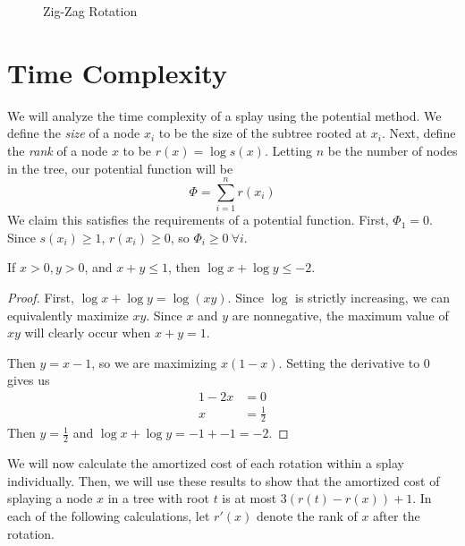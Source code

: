\documentclass[12pt]{article}
\newcommand{\lskip}{\vspace{\baselineskip}}
\begin{document}
\begin{enumerate}
\begin{figure}[!ht]
      \caption{Zig-Zag Rotation}
    \end{figure}
\end{enumerate}

\section*{Time Complexity}
We will analyze the time complexity of a splay using the potential method. We define the \emph{size} of a node $x_i$ to be the size of the subtree rooted at $x_i$. Next, define the \emph{rank} of a node $x$ to be $r(x) = \log s(x)$. Letting $n$ be the number of nodes in the tree, our potential function will be
\[ \Phi = \sum_{i=1}^n r(x_i) \]
We claim this satisfies the requirements of a potential function. First, $\Phi_1 = 0$. Since $s(x_i) \geq 1$, $r(x_i) \geq 0$, so $\Phi_i \geq 0 \ \forall i$.
\lskip

\begin{lemma}
  If $x>0, y>0$, and $x+y \leq 1$, then $\log x + \log y \leq -2$.
\end{lemma}

\begin{proof}
  First, $\log x + \log y = \log (xy)$. Since $\log$ is strictly increasing, we can equivalently maximize $xy$. Since $x$ and $y$ are nonnegative, the maximum value of $xy$ will clearly occur when $x+y=1$.

  Then $y = x-1$, so we are maximizing $x(1-x)$. Setting the derivative to 0 gives us
  \begin{align*}
    1-2x &= 0 \\
    x &= \frac{1}{2}
  \end{align*}
  Then $y = \frac{1}{2}$ and $\log x + \log y = -1 + -1 = -2$.
\end{proof}

We will now calculate the amortized cost of each rotation within a splay individually. Then, we will use these results to show that the amortized cost of splaying a node $x$ in a tree with root $t$ is at most $3(r(t) - r(x)) + 1$. In each of the following calculations, let $r'(x)$ denote the rank of $x$ after the rotation.
\end{document}
